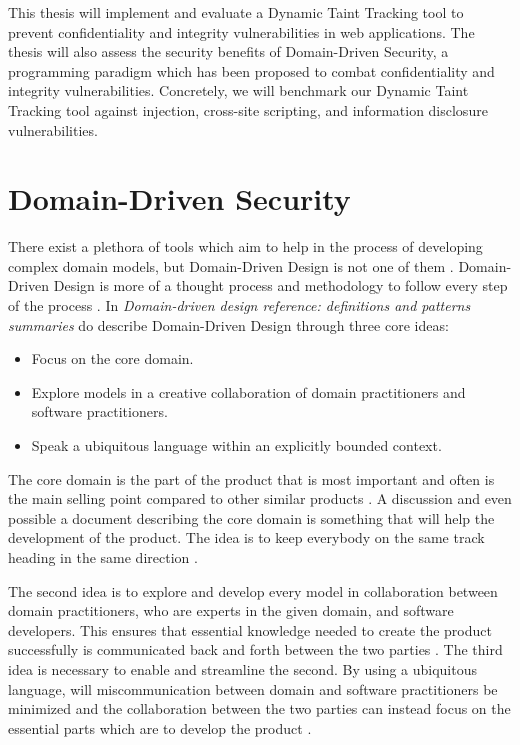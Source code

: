 This thesis will implement and evaluate a Dynamic Taint Tracking tool to prevent confidentiality and integrity vulnerabilities in web applications. The thesis will also assess the security benefits of Domain-Driven Security, a programming paradigm which has been proposed to combat confidentiality and integrity vulnerabilities. Concretely, we will benchmark our Dynamic Taint Tracking tool against injection, cross-site scripting, and information disclosure vulnerabilities.



\section{Domain-Driven Security}
\label{DomainDrivenSecurity}
There exist a plethora of tools which aim to help in the process of developing complex domain models, but Domain-Driven Design is not one of them \parencite{Bankes, 10.1007/978-3-319-24309-2_33}. Domain-Driven Design is more of a thought process and methodology to follow every step of the process \parencite{EvansEric2004Dd:t}. In \emph{Domain-driven design reference: definitions and patterns summaries} do \textcite{evans_2015} describe Domain-Driven Design through three core ideas:

\begin{itemize}
    \item Focus on the core domain.
    \item Explore models in a creative collaboration of domain practitioners and software practitioners.
    \item Speak a ubiquitous language within an explicitly bounded context.
\end{itemize}

The core domain is the part of the product that is most important and often is the main selling point compared to other similar products \parencite{millett_2015}. A discussion and even possible a document describing the core domain is something that will help the development of the product. The idea is to keep everybody on the same track heading in the same direction \parencite{EvansEric2004Dd:t}.

The second idea is to explore and develop every model in collaboration between domain practitioners, who are experts in the given domain, and software developers. This ensures that essential knowledge needed to create the product successfully is communicated back and forth between the two parties \parencite{millett_2015}. The third idea is necessary to enable and streamline the second. By using a ubiquitous language, will miscommunication between domain and software practitioners be minimized and the collaboration between the two parties can instead focus on the essential parts which are to develop the product \parencite{evans_2015}.

